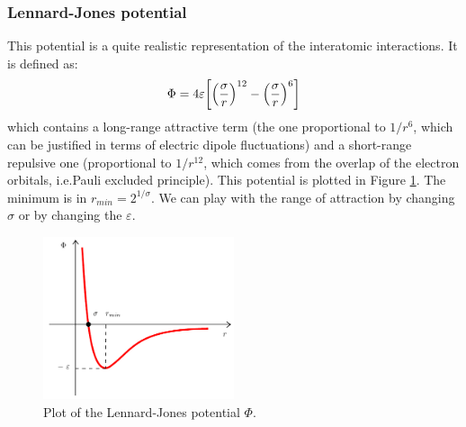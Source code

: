 \documentclass[../main/main.tex]{subfiles}
\begin{document}
\subsubsection{Lennard-Jones potential}
This potential is a quite realistic representation of the interatomic interactions. It is defined as:
\begin{equation}
  \Phi = 4 \varepsilon \qty[\qty(\frac{\sigma }{r})^{12} - \qty(\frac{\sigma }{r})^6  ]
\end{equation}
which contains a long-range attractive term (the one proportional to \( 1/r^6 \), which can be justified in terms of electric dipole fluctuations) and a short-range repulsive one (proportional to \( 1/r^{12} \), which comes from the overlap of the electron orbitals, i.e.Pauli excluded principle). This potential is plotted in Figure \ref{fig:15_13}.  The minimum is in \( r_{min}=2^{1/\sigma } \).   We can play with the range of attraction by changing \( \sigma  \) or by changing the   \( \varepsilon  \).


\begin{figure}[h!]
\centering
\includegraphics[width=0.5\textwidth]{../lessons/15_image/2.pdf}
\caption{\label{fig:15_13} Plot of the Lennard-Jones potential \( \Phi  \).}
\end{figure}
\end{document}
